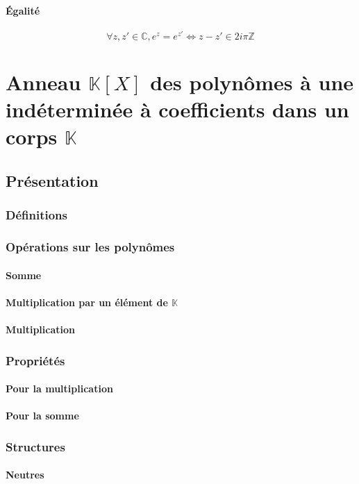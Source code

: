 \documentclass[12pt,a4paper,french]{book}
\begin{document}
			\subsubsection{Égalité}
			\[\forall z,z' \in \mathbb{C}, e^{z} = e^{z'} \Leftrightarrow z-z' \in 2i\pi\mathbb{Z}\]
			
		
\chapter{Anneau $\mathbb{K}[X]$ des polynômes à une indéterminée à coefficients dans un corps $\mathbb{K}$}
	\section{Présentation}
		\subsection{Définitions}
		\subsection{Opérations sur les polynômes}
			\subsubsection{Somme}
			\subsubsection{Multiplication par un élément de $\mathbb{K}$}
			\subsubsection{Multiplication}
		\subsection{Propriétés}
			\subsubsection{Pour la multiplication}
			\subsubsection{Pour la somme}
		\subsection{Structures}
			\subsubsection{Neutres}
\end{document}
